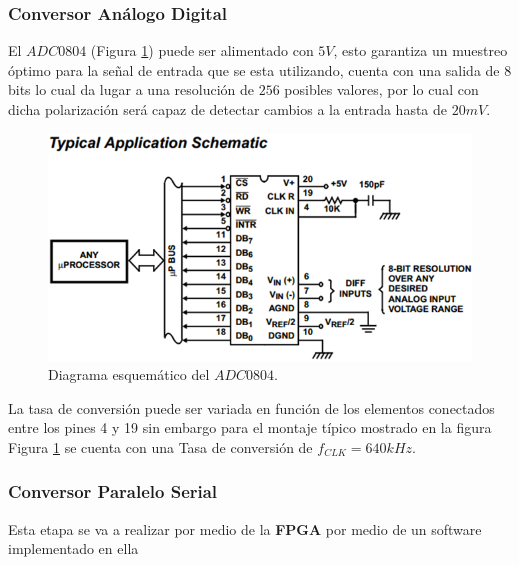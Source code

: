\documentclass[10pt,graphicx,caption,rotating]{article}
\begin{document}
\subsubsection{Conversor Análogo Digital} \label{ADC}
\noindent
El $ADC 0804$ (Figura \ref{fig2}) puede ser alimentado con $5 V$, esto garantiza un muestreo óptimo para la señal de entrada que se esta utilizando, cuenta con una salida de $8$ bits lo cual da lugar a una resolución de $256$ posibles valores, por lo cual con dicha polarización será capaz de detectar cambios a la entrada  hasta de $20mV$.
\begin{figure}[H]
	\centering
		\includegraphics[scale=0.4]{ADC.png}
	\caption{Diagrama esquemático del $ADC0804$.}
	\label{fig2}
\end{figure}
\noindent
La tasa de conversión puede ser variada en función de los elementos conectados entre los pines  4 y 19 sin embargo para el montaje típico mostrado en la figura Figura \ref{fig2} se cuenta con una Tasa de conversión de $f_{CLK} = 640kHz$.

\subsubsection{Conversor Paralelo Serial}
\noindent
Esta etapa se va a realizar por medio de la \textbf{FPGA} por medio de un software implementado en ella
\end{document}
